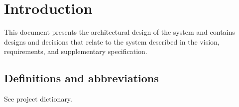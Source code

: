 
\section{Introduction}

This document presents the architectural design of the system and contains
designs and decisions that relate to the system described in the vision,
requirements, and supplementary specification.

\subsection{Definitions and abbreviations}
See project dictionary.
